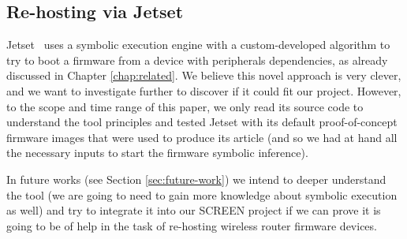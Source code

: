 \subsection{Re-hosting via Jetset}
\label{sec:result-jetset}

Jetset~\cite{jetset} uses a symbolic execution engine with a custom-developed algorithm to try to boot a firmware from a device with peripherals dependencies, as already discussed in Chapter \ref{chap:related}. We believe this novel approach is very clever, and we want to investigate further to discover if it could fit our project. However, to the scope and time range of this paper, we only read its source code to understand the tool principles and tested Jetset with its default proof-of-concept firmware images that were used to produce its article (and so we had at hand all the necessary inputs to start the firmware symbolic inference).

In future works (see Section \ref{sec:future-work}) we intend to deeper understand the tool (we are going to need to gain more knowledge about symbolic execution as well) and try to integrate it into our SCREEN project if we can prove it is going to be of help in the task of re-hosting wireless router firmware devices.